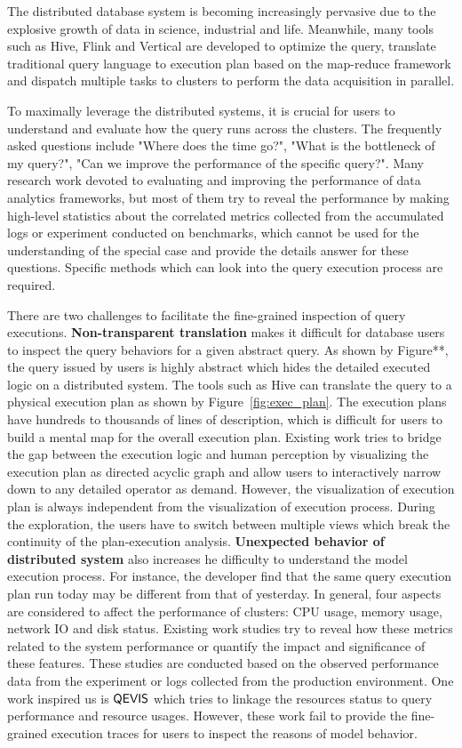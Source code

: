 The distributed database system is becoming increasingly pervasive due to the explosive growth of data in science, industrial and life.
Meanwhile, many tools such as Hive, Flink and Vertical are developed to optimize the query, translate traditional query language to execution plan based on the map-reduce framework and dispatch multiple tasks to clusters to perform the data acquisition in parallel.

To maximally leverage the distributed systems, it is crucial for users to understand and evaluate how the query runs across the clusters. The frequently asked questions include "Where does the time go?", "What is the bottleneck of my query?", "Can we improve the performance of the specific query?".  Many research work devoted to evaluating and improving the performance of data analytics frameworks, but most of them try to reveal the performance by making high-level statistics about the correlated metrics collected from the accumulated logs or experiment conducted on benchmarks, which cannot be used for the understanding of the special case and provide the details answer for these questions. Specific methods which can look into the query execution process are required.

There are two challenges to facilitate the fine-grained inspection of query executions. 
\textbf{Non-transparent translation} makes it difficult for database users to inspect the query behaviors for a given abstract query. As shown by Figure**, the query issued by users is highly abstract which hides the detailed executed logic on a distributed system. The tools such as Hive can translate the query to a physical execution plan as shown by Figure~\ref{fig:exec_plan}. The execution plans have hundreds to thousands of lines of description, which is difficult for users to build a mental map for the overall execution plan. Existing work tries to bridge the gap between the execution logic and human perception by visualizing the execution plan as directed acyclic graph and allow users to interactively narrow down to any detailed operator as demand. However, the visualization of execution plan is always independent from the visualization of execution process. During the exploration, the users have to switch between multiple views which break the continuity of the plan-execution analysis.
\textbf{Unexpected behavior of distributed system} also increases he difficulty to understand the model execution process. For instance, the developer find that the same query execution plan run today may be different from that of yesterday. In general, four aspects are considered to affect the performance of clusters: CPU usage, memory usage, network IO and disk status. Existing work studies try to reveal how these metrics related to the system performance or quantify the impact and significance of these features. These studies are conducted based on the observed performance data from the experiment or logs collected from the production environment. One work inspired us is $\mathsf{QEVIS}$ which tries to linkage the resources status to query performance and resource usages. However, these work fail to provide the fine-grained execution traces for users to inspect the reasons of model behavior.

